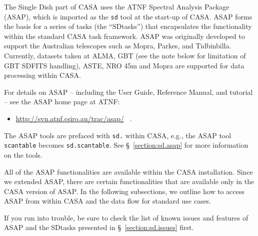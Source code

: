 The Single Dish part of CASA uses the ATNF Spectral Analysis Package (ASAP), 
which is imported as the {\tt sd} tool at the start-up of CASA. 
ASAP forms the basis for a series
of tasks (the ``SDtasks'') that encapsulates the functionality
within the standard CASA task framework.  
ASAP was originally developed to
support the Australian telescopes such as Mopra, Parkes, and
Tidbinbilla.
Currently, datasets taken at ALMA, GBT (see the note below for limitation of 
GBT SDFITS handling), ASTE, NRO 45m and Mopra are supported for data processing 
within CASA. 


For details on ASAP -- including the User Guide, Reference Manual, and tutorial -- see
the ASAP home page at ATNF: 
\begin{itemize}
   \item \url{http://svn.atnf.csiro.au/trac/asap/} \, .
\end{itemize}
The ASAP tools are prefaced with {\tt sd.} within CASA, e.g., the ASAP tool {\tt scantable} becomes
{\tt sd.scantable}.  See \S~\ref{section:sd.asap} for more
information on the tools.

All of the ASAP functionalities are available within the CASA
installation.  Since we extended ASAP, there
are certain functionalities that are available only in the CASA version of ASAP.
In the following subsections, we outline how to access ASAP
from within CASA and the data flow for standard use cases.

If you run into trouble, be sure to check the list of known issues
and features of ASAP and the SDtasks presented in 
\S~\ref{section:sd.issues} first.



